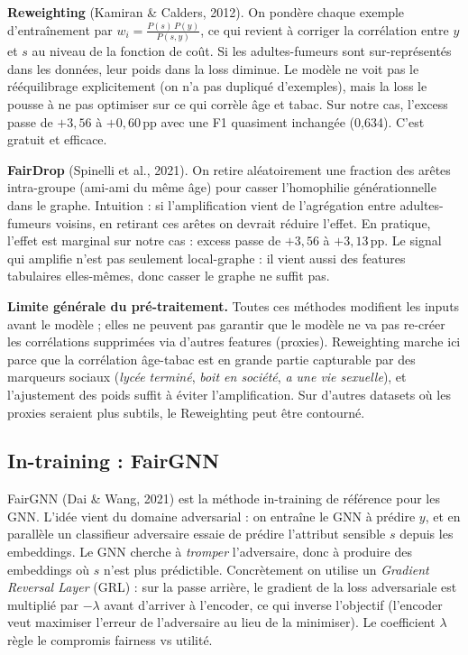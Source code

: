 \documentclass[10pt,a4paper,twocolumn]{article}
\begin{document}
\textbf{Reweighting} (Kamiran \& Calders, 2012). On pondère chaque exemple d'entraînement par $w_i = \frac{P(s)\,P(y)}{P(s,y)}$, ce qui revient à corriger la corrélation entre $y$ et $s$ au niveau de la fonction de coût. Si les adultes-fumeurs sont sur-représentés dans les données, leur poids dans la loss diminue. Le modèle ne voit pas le rééquilibrage explicitement (on n'a pas dupliqué d'exemples), mais la loss le pousse à ne pas optimiser sur ce qui corrèle âge et tabac. Sur notre cas, l'excess passe de $+3{,}56$ à $+0{,}60$\,pp avec une F1 quasiment inchangée (0{,}634). C'est gratuit et efficace.

\textbf{FairDrop} (Spinelli et al., 2021). On retire aléatoirement une fraction des arêtes intra-groupe (ami-ami du même âge) pour casser l'homophilie générationnelle dans le graphe. Intuition : si l'amplification vient de l'agrégation entre adultes-fumeurs voisins, en retirant ces arêtes on devrait réduire l'effet. En pratique, l'effet est marginal sur notre cas : excess passe de $+3{,}56$ à $+3{,}13$\,pp. Le signal qui amplifie n'est pas seulement local-graphe : il vient aussi des features tabulaires elles-mêmes, donc casser le graphe ne suffit pas.

\textbf{Limite générale du pré-traitement.} Toutes ces méthodes modifient les inputs avant le modèle ; elles ne peuvent pas garantir que le modèle ne va pas re-créer les corrélations supprimées via d'autres features (proxies). Reweighting marche ici parce que la corrélation âge-tabac est en grande partie capturable par des marqueurs sociaux (\emph{lycée terminé}, \emph{boit en société}, \emph{a une vie sexuelle}), et l'ajustement des poids suffit à éviter l'amplification. Sur d'autres datasets où les proxies seraient plus subtils, le Reweighting peut être contourné.

\subsection{In-training : FairGNN}

FairGNN (Dai \& Wang, 2021) est la méthode in-training de référence pour les GNN. L'idée vient du domaine adversarial : on entraîne le GNN à prédire $y$, et en parallèle un classifieur adversaire essaie de prédire l'attribut sensible $s$ depuis les embeddings. Le GNN cherche à \emph{tromper} l'adversaire, donc à produire des embeddings où $s$ n'est plus prédictible. Concrètement on utilise un \emph{Gradient Reversal Layer} (GRL) : sur la passe arrière, le gradient de la loss adversariale est multiplié par $-\lambda$ avant d'arriver à l'encoder, ce qui inverse l'objectif (l'encoder veut maximiser l'erreur de l'adversaire au lieu de la minimiser). Le coefficient $\lambda$ règle le compromis fairness vs utilité.
\end{document}
